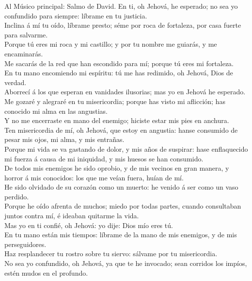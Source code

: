  Al Músico principal: Salmo de David. En ti, oh Jehová, he
esperado; no sea yo confundido para siempre: líbrame en tu justicia.\\
 Inclina á mí tu oído, líbrame presto; séme por roca de
fortaleza, por casa fuerte para salvarme.\\
 Porque tú eres mi roca y mi castillo; y por tu nombre me
guiarás, y me encaminarás.\\
 Me sacarás de la red que han escondido para mí; porque tú
eres mi fortaleza.\\
 En tu mano encomiendo mi espíritu: tú me has redimido, oh
Jehová, Dios de verdad.\\
 Aborrecí á los que esperan en vanidades ilusorias; mas yo
en Jehová he esperado.\\
 Me gozaré y alegraré en tu misericordia; porque has visto
mi aflicción; has conocido mi alma en las angustias.\\
 Y no me encerraste en mano del enemigo; hiciste estar mis
pies en anchura.\\
 Ten misericordia de mí, oh Jehová, que estoy en angustia:
hanse consumido de pesar mis ojos, mi alma, y mis entrañas.\\
 Porque mi vida se va gastando de dolor, y mis años de
suspirar: hase enflaquecido mi fuerza á causa de mi iniquidad, y mis
huesos se han consumido.\\
 De todos mis enemigos he sido oprobio, y de mis vecinos
en gran manera, y horror á mis conocidos: los que me veían fuera, huían
de mí.\\
 He sido olvidado de su corazón como un muerto: he venido
á ser como un vaso perdido.\\
 Porque he oído afrenta de muchos; miedo por todas
partes, cuando consultaban juntos contra mí, é ideaban quitarme la
vida.\\
 Mas yo en ti confié, oh Jehová: yo dije: Dios mío eres
tú.\\
 En tu mano están mis tiempos: líbrame de la mano de mis
enemigos, y de mis perseguidores.\\
 Haz resplandecer tu rostro sobre tu siervo: sálvame por
tu misericordia.\\
 No sea yo confundido, oh Jehová, ya que te he invocado;
sean corridos los impíos, estén mudos en el profundo.\\
